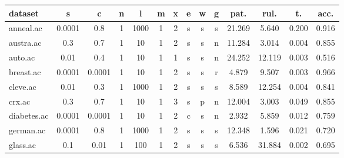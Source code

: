 \begin{table}[htbp]
	\centering
		\begin{tabular}{|l|c|c|c|c|c|c|c|c|c||c|c|c|c|}
		\hline
		\textbf{dataset}	& \textbf{s}	& \textbf{c}	& \textbf{n}	& \textbf{l}	& \textbf{m}	& \textbf{x}	& \textbf{e} & \textbf{w} & \textbf{g} & \textbf{pat.}	& \textbf{rul.}	& \textbf{t.}	& \textbf{acc.}	\\
		\hline
		anneal.ac      & 0.0001   & 0.8         & 1              & 1000                & 1             & 2             & s      & s        & s        & 21.269         & 5.640          & 0.200          & 0.916          \\
		\hline
		austra.ac      & 0.3      & 0.7         & 1              & 10                  & 1             & 2             & s      & s        & n        & 11.284         & 3.014          & 0.004          & 0.855          \\
		\hline
		auto.ac        & 0.01     & 0.4         & 1              & 10                  & 1             & 1             & s      & s        & n        & 24.252         & 12.119         & 0.003          & 0.516          \\
		\hline
		breast.ac      & 0.0001   & 0.0001      & 1              & 10                  & 1             & 2             & s      & s        & r        & 4.879          & 9.507          & 0.003          & 0.966          \\
		\hline
		cleve.ac       & 0.01     & 0.3         & 1              & 1000                & 1             & 2             & s      & s        & s        & 8.589          & 12.254         & 0.004          & 0.841          \\
		\hline
		crx.ac         & 0.3      & 0.7         & 1              & 10                  & 1             & 3             & s      & p        & n        & 12.004         & 3.003          & 0.049          & 0.855          \\
		\hline
		diabetes.ac    & 0.0001   & 0.0001      & 1              & 10                  & 1             & 2             & c      & s        & n        & 2.932          & 5.859          & 0.012          & 0.759          \\
		\hline
		german.ac      & 0.0001   & 0.8         & 1              & 1000                & 1             & 2             & s      & s        & s        & 12.348         & 1.596          & 0.021          & 0.720          \\
		\hline
		glass.ac       & 0.1      & 0.01        & 1              & 100                 & 1             & 2             & s      & s        & s        & 6.536          & 31.884         & 0.002          & 0.695          \\

\end{tabular}
\end{table}
